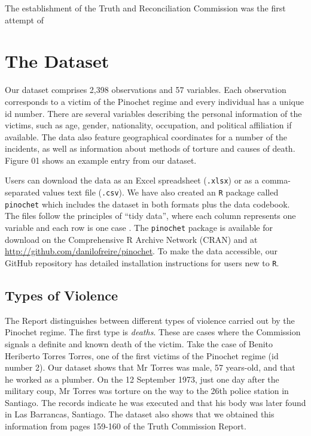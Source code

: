 \documentclass[12pt,a4paper,]{article}
\begin{document}
The establishment of the Truth and Reconciliation Commission was the
first attempt of

\hypertarget{the-dataset}{%
\section{The Dataset}\label{the-dataset}}

Our dataset comprises 2,398 observations and 57 variables. Each
observation corresponds to a victim of the Pinochet regime and every
individual has a unique id number. There are several variables
describing the personal information of the victims, such as age, gender,
nationality, occupation, and political affiliation if available. The
data also feature geographical coordinates for a number of the
incidents, as well as information about methods of torture and causes of
death. Figure 01 shows an example entry from our dataset.

Users can download the data as an Excel spreadsheet (\texttt{.xlsx}) or
as a comma-separated values text file (\texttt{.csv}). We have also
created an \texttt{R} package called \texttt{pinochet} which includes
the dataset in both formats plus the data codebook. The files follow the
principles of ``tidy data'', where each column represents one variable
and each row is one case \citep{wickham2014tidy}. The \texttt{pinochet}
package is available for download on the Comprehensive R Archive Network
(CRAN) and at \url{http://github.com/danilofreire/pinochet}. To make the
data accessible, our GitHub repository has detailed installation
instructions for users new to \texttt{R}.

\hypertarget{types-of-violence}{%
\subsection{Types of Violence}\label{types-of-violence}}

The Report distinguishes between different types of violence carried out
by the Pinochet regime. The first type is \emph{deaths}. These are cases
where the Commission signals a definite and known death of the victim.
Take the case of Benito Heriberto Torres Torres, one of the first
victims of the Pinochet regime (id number 2). Our dataset shows that Mr
Torres was male, 57 years-old, and that he worked as a plumber. On the
12 September 1973, just one day after the military coup, Mr Torres was
torture on the way to the 26th police station in Santiago. The records
indicate he was executed and that his body was later found in Las
Barrancas, Santiago. The dataset also shows that we obtained this
information from pages 159-160 of the Truth Commission Report.
\end{document}
